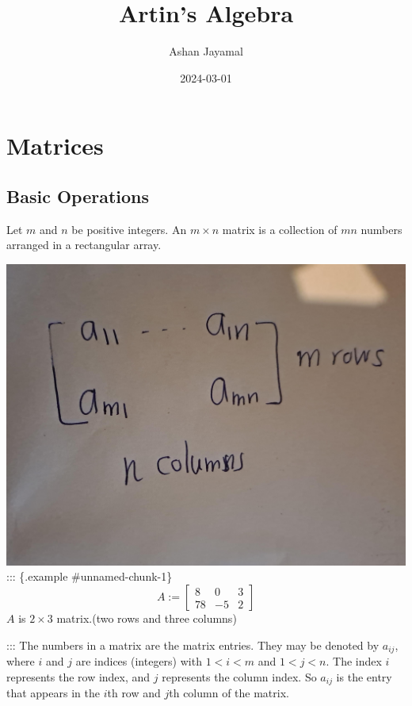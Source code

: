 \documentclass[
]{book}
\title{Artin's Algebra}
\author{Ashan Jayamal}
\date{2024-03-01}
\theoremstyle{definition}
\theoremstyle{definition}
\theoremstyle{definition}
\theoremstyle{definition}
\theoremstyle{remark}
\begin{document}
\maketitle

{
\setcounter{tocdepth}{1}
\tableofcontents
}
\hypertarget{matrices}{%
\chapter{Matrices}\label{matrices}}

\hypertarget{basic-operations}{%
\section{Basic Operations}\label{basic-operations}}

Let \(m\) and \(n\) be positive integers. An \(m \times n\) matrix is a collection of \(mn\) numbers arranged in a rectangular array.

\includegraphics{figures/ch_1/fig01.jpg}
::: \{.example \#unnamed-chunk-1\}
\[A:=\begin{bmatrix}
8 & 0 & 3\\
78 & -5 & 2
\end{bmatrix}\]
\(A\) is \(2 \times 3\) matrix.(two rows and three columns)

:::
The numbers in a matrix are the matrix entries. They may be denoted by \(a_{ij}\), where \(i\) and \(j\) are indices (integers) with \(1 < i < m\) and \(1 < j < n\). The index \(i\) represents the row index, and \(j\) represents the column index. So \(a_{ij}\) is the entry that appears in the \(i\)th row and \(j\)th column of the matrix.
\end{document}
